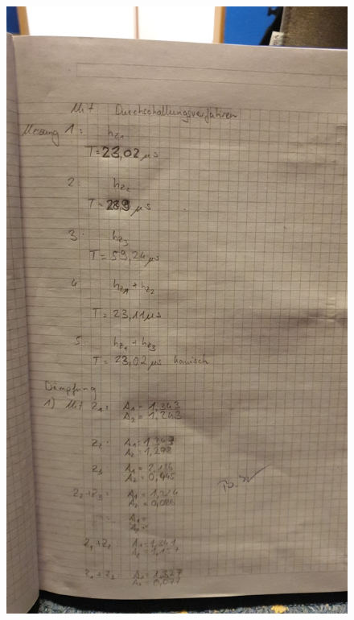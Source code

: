 \begin{figure}
    \centering
    \includegraphics[width=\textwidth]{data/Messdaten_2.jpeg}
\end{figure}

